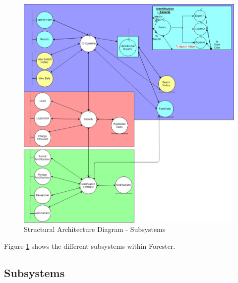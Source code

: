 \documentclass[]{article}
\begin{document}
    \begin{figure}
      \includegraphics[width=\linewidth]{subsystems.jpg}
      \caption{Structural Architecture Diagram - Subsystems}
      \label{fig:SAD1}
    \end{figure}
    
    Figure \ref{fig:SAD1} shows the different subsystems within Forester.


\subsection{Subsystems}
\label{sub:subsystems}
\end{document}
